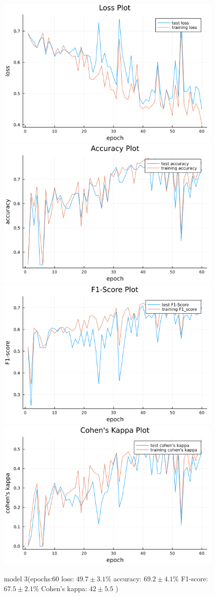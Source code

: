 \documentclass[
a4paper, 
12pt,
grayscalebody, %
abstract=on,
twoside, BCOR10mm, 12pt, DIV13,headinclude, footexclude, final, abstracton, openright
]{ibireprt}
\numberwithin{equation}{chapter}
\numberwithin{table}{chapter}
\numberwithin{figure}{chapter}
\numberwithin{algorithm}{chapter}
\numberwithin{example}{chapter}
\numberwithin{example}{chapter}
\begin{document}
\begin{figure}
	\includegraphics[width=0.4\linewidth]{loss_png_final_1_3.png}\hfill
	\includegraphics[width=0.4\linewidth]{accuracy_png_final_1_3.png}
	\\[\smallskipamount]
	\includegraphics[width=0.4\linewidth]{f1_score_png_final_1_3.png}\hfill
	\includegraphics[width=0.4\linewidth]{cohens_kappa_png_final_1_3.png}
	\caption{model 3(epochs:60 loss: $49.7\pm3.1\% $ accuracy: $69.2\pm4.1\%$ F1-score: $67.5\pm2.1\%$  Cohen's kappa: $42\pm5.5$ )}
	\label{fig:model_3_60}
\end{figure}
\end{document}
